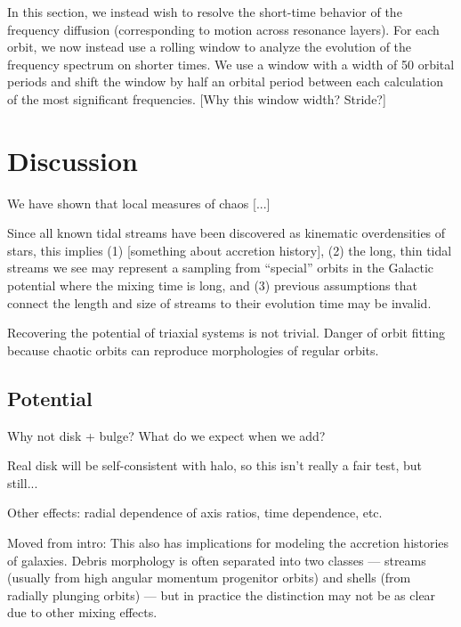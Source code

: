 \documentclass[letterpaper,12pt,preprint]{aastex}
\begin{document}
In this section, we instead wish to resolve the short-time behavior of the frequency diffusion (corresponding to motion across resonance layers). For each orbit, we now instead use a rolling window to analyze the evolution of the frequency spectrum on shorter times. We use a window with a width of 50 orbital periods and shift the window by half an orbital period between each calculation of the most significant frequencies. [Why this window width? Stride?]


\section{Discussion}\label{sec:discussion}

We have shown that local measures of chaos [...]

Since all known tidal streams have been discovered as kinematic overdensities of stars, this implies (1) [something about accretion history], (2) the long, thin tidal streams we see may represent a sampling from ``special'' orbits in the Galactic potential where the mixing time is long, and (3) previous assumptions that connect the length and size of streams to their evolution time may be invalid.

Recovering the potential of triaxial systems is not trivial. Danger of orbit fitting because chaotic orbits can reproduce morphologies of regular orbits.

\subsection{Potential}

Why not disk + bulge? What do we expect when we add?

Real disk will be self-consistent with halo, so this isn't really a fair test, but still...

Other effects: radial dependence of axis ratios, time dependence, etc.

Moved from intro:
This also has implications for modeling the accretion histories of galaxies. Debris morphology is often separated into two classes --- streams (usually from high angular momentum progenitor orbits) and shells (from radially plunging orbits) --- but in practice the distinction may not be as clear due to other mixing effects.
\end{document}
